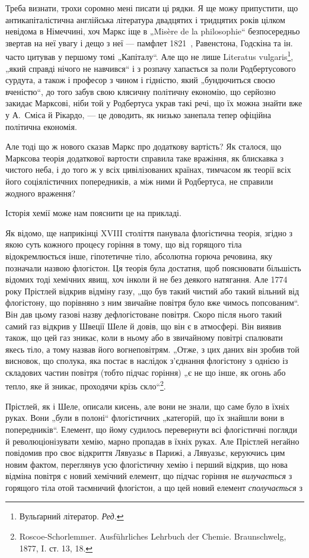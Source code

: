 
Треба визнати, трохи соромно мені писати ці рядки. Я ще можу
припустити, що антикапіталістична англійська література двадцятих і
тридцятих років цілком невідома в Німеччині, хоч Маркс іще в „Misère
de la philosophie“ безпосередньо звертав на неї увагу і дещо з неї —
памфлет 1821~, Равенстона, Годскіна та ін. часто цитував у першому
томі „Капіталу“. Але що не лише Literatus vulgaris\footnote*{
Вульґарний літератор. \emph{Ред.}
}, „який справді
нічого не навчився“ і з розпачу хапається за поли Родбертусового сурдута,
а також і професор з чином і гідністю, який „бундючиться
своєю вченістю“, до того забув свою клясичну політичну економію, що
серйозно закидає Марксові, ніби той у Родбертуса украв такі речі, що
їх можна знайти вже у А.~Сміса й Рікардо, — це доводить, як низько
занепала тепер офіційна політична економія.

Але тоді що ж нового сказав Маркс про додаткову вартість? Як
сталося, що Марксова теорія додаткової вартости справила таке вражіння,
як блискавка з чистого неба, і до того ж у всіх цивілізованих країнах,
тимчасом як теорії всіх його соціялістичних попередників, а між ними й
Родбертуса, не справили жодного враження?

Історія хемії може нам пояснити це на прикладі.

Як відомо, ще наприкінці XVIII століття панувала флогістична теорія,
згідно з якою суть кожного процесу горіння в тому, що від горящого
тіла відокремлюється інше, гіпотетичне тіло, абсолютна горюча речовина,
яку позначали назвою флогістон. Ця теорія була достатня, щоб пояснювати
більшість відомих тоді хемічних явищ, хоч інколи й не без деякого
натягання. Але 1774 року Прістлей відкрив відміну газу, „що був такий
чистий або такий вільний від флогістону, що порівняно з ним звичайне
повітря було вже чимось попсованим“. Він дав цьому газові назву дефлогістоване
повітря. Скоро після нього такий самий газ відкрив у Швеції
Шеле й довів, що він є в атмосфері. Він виявив також, що цей газ
зникає, коли в ньому або в звичайному повітрі спалювати якесь тіло, а
тому назвав його вогнеповітрям. „Отже, з цих даних він зробив той
висновок, що сполука, яка постає в наслідок з’єднання флогістону з
однією із складових частин повітря (тобто підчас горіння) „є не що
інше, як огонь або тепло, яке й зникає, проходячи крізь скло“\footnote{
Roscoe-Schorlemmer. Ausführliches Lehrbuch der Chemie. Braunschwelg, 1877,
I. ст. 13, 18.
}.

Прістлей, як і Шеле, описали кисень, але вони не знали, що саме
було в їхніх руках. Вони „були в полоні“ флогістичних „категорій, що
їх знайшли вони в попередників“. Елемент, що йому судилось перевернути
всі флогістичні погляди й революціонізувати хемію, марно пропадав
в їхніх руках. Але Прістлей негайно повідомив про своє відкриття
Лявуазьє в Парижі, а Лявуазьє, керуючись цим новим фактом, переглянув
усю флогістичну хемію і перший відкрив, що нова відміна повітря
є новий хемічний елемент, що підчас горіння не \emph{вилучається} з горящого
тіла отой таємничий флогістон, а що цей новий елемент \emph{сполучається} з
\parbreak{}  %
